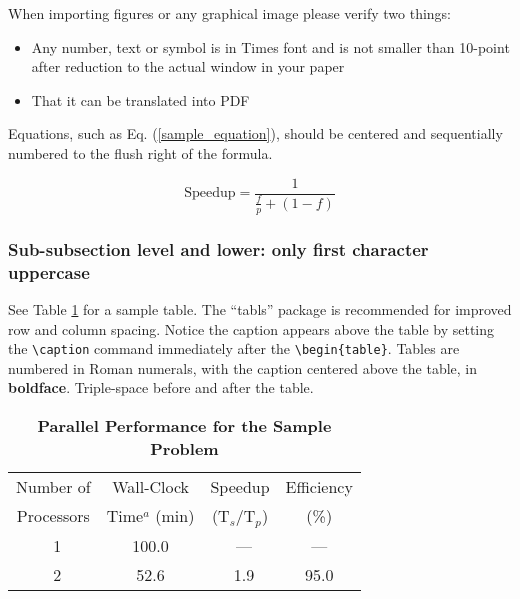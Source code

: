 \documentclass[letterpaper]{mandc2019}
\begin{document}
When importing figures or any graphical image please verify two things:
\vspace{-0.65cm} %
\begin{itemize} \itemsep1pt \parskip0pt 
\item Any number, text or symbol is in Times font and is not smaller than 
  10-point after reduction to the actual window in your paper
\item That it can be translated into PDF
\end{itemize}

Equations, such as Eq. (\ref{sample_equation}), should be centered and 
sequentially numbered to the flush right of the formula.

\begin{equation}
  \label{sample_equation}
  \mathrm{Speedup}=\frac{1}{\frac{f}{p}+(1-f)}
\end{equation}


\subsubsection{Sub-subsection level and lower: only first character uppercase}

See Table \ref{table:example} for a sample table.  The ``tabls'' package is
recommended for improved row and column spacing.  Notice the caption appears 
above the table by setting the \verb!\caption! command immediately 
after the \verb!\begin{table}!. Tables are numbered in Roman 
numerals, with the caption centered above the table, in \textbf{boldface}.  
Triple-space before and after the table.

\begin{table}[!htb]
  \centering
  \caption{\bf Parallel Performance for the Sample Problem}
  \label{table:example} 
  \begin{tabular}{|c|c|c|c|} \hline 
   Number of & Wall-Clock & Speedup & Efficiency \\
   Processors & Time$^{a}$ (min) & (T$_{s}$/T$_{p}$) & (\%) \\ \hline
    \ 1 &  100.0 & \ ---    & ---  \\ \hline
    \ 2 &   52.6 & \ 1.9    & 95.0 \\ \hline 
  \end{tabular}
\end{table}
\end{document}
